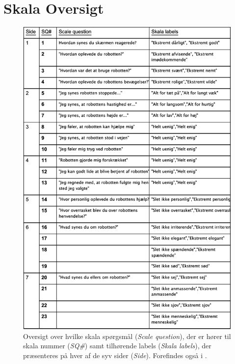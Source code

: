 \section{Skala Oversigt}
\label{SkalaOversigt}
%
\begin{figure}[H]
\centering
\includegraphics[width = \textwidth]{Figure/DatabehandlingSkalaer/SkalaOversigt} 
\caption{Oversigt over hvilke skala spørgsmål (\textit{Scale question}), der er hører til skala nummer (\textit{SQ\#}) samt tilhørende labels (\textit{Skala labels}), der præsenteres på hver af de syv sider (\textit{Side}). Forefindes også i .}
\label{fig:SkalaOversigt}
\end{figure}
\newpage
%